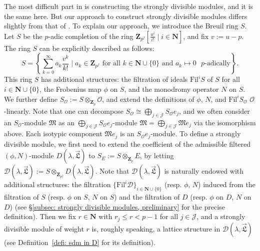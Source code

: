 \documentclass[11pt]{amsart}
\theoremstyle{definition}
\numberwithin{equation}{subsection}
\theoremstyle{plain}
\theoremstyle{plain}
\theoremstyle{plain}
\theoremstyle{plain}
\theoremstyle{plain}
\theoremstyle{plain}
\theoremstyle{plain}
\theoremstyle{plain}
\theoremstyle{plain}
\theoremstyle{plain}
\theoremstyle{plain}
\theoremstyle{plain}
\theoremstyle{definition}
\theoremstyle{definition}
\theoremstyle{definition}
\theoremstyle{remark}
\renewcommand{\(}{\textup{(}}
\renewcommand{\)}{\textup{)}}
\newcommand{\N}{\mathbf{N}}
\newcommand{\Z}{\mathbf{Z}}
\newcommand{\fM}{\mathfrak{M}}
\newcommand{\fL}{\mathfrak{L}}
\newcommand{\Fil}{\mathrm{Fil}}
\newcommand{\cD}{\mathcal{D}}
\newcommand{\cO}{\mathcal{O}}
\newcommand{\cJ}{\mathcal{J}}
\newcommand{\vL}{\vec{\fL}}
\begin{document}
The most difficult part in \cite{BM,GP} is constructing the strongly divisible modules, and it is the same here. But our approach to construct strongly divisible modules differs slightly from that of \cite{BM}. To explain our approach, we introduce the Breuil ring $S$. Let $S$ be the $p$-adic completion of the ring $\Z_{p^f}[\frac{u^i}{i!}\mid i\in\N]$, and fix $v:=u-p$. The ring $S$ can be explicitly described as follows:
$$S=\left\{\sum_{k=0}^{\infty}a_k\frac{v^k}{k!}\mid a_k\in\Z_{p^f}\mbox{ for all }k\in\N\cup\{0\}\mbox{ and }a_k\mapsto 0\mbox{ $p$-adically} \right\}.$$
This ring $S$ has additional structures: the filtration of ideals $\Fil^iS$ of $S$ for all $i\in\N\cup\{0\}$, the Frobenius map $\phi$ on $S$, and the monodromy operator $N$ on $S$. We further define $S_\cO:=S\otimes_{\Z_p}\cO$, and extend the definitions of $\phi$, $N$, and $\Fil^iS_{\cO}$ $\cO$-linearly. Note that one can decompose $S_\cO\cong\bigoplus_{j\in\cJ}S_\cO e_j$, and we often consider an $S_\cO$-module $\fM$ as an $\bigoplus_{j\in\cJ}S_\cO e_j$-module $\fM=\bigoplus_{j\in\cJ}\fM e_j$ via the isomorphism above. Each isotypic component $\fM e_j$ is an $S_\cO e_j$-module. To define a strongly divisible module, we first need to extend the coefficient of the admissible filtered $(\phi,N)$-module $D(\lambda,\vL)$ to $S_E:=S\otimes_{\Z_p}E$, by letting $\cD(\lambda,\vL):=S\otimes_{\Z_{p^f}}D(\lambda,\vL)$. Note that $\cD(\lambda,\vL)$ is naturally endowed with additional structures: the filtration $\{\Fil^i\cD\}_{i\in\N\cup\{0\}}$ (resp. $\phi$, $N$) induced from the filtration of $S$ (resp. $\phi$ on $S$, $N$ on $S$) and the filtration of $D$ (resp. $\phi$ on $D$, $N$ on $D$) (see \S\ref{subsec: strongly divisible modules, preliminary} for the precise definition). Then we fix $r\in\N$ with $r_j\leq r<p-1$ for all $j\in\cJ$, and a strongly divisible module of weight $r$ is, roughly speaking, a lattice structure in $\cD(\lambda,\vL)$ (see Definition~\ref{defi: sdm in D} for its definition).
\end{document}
